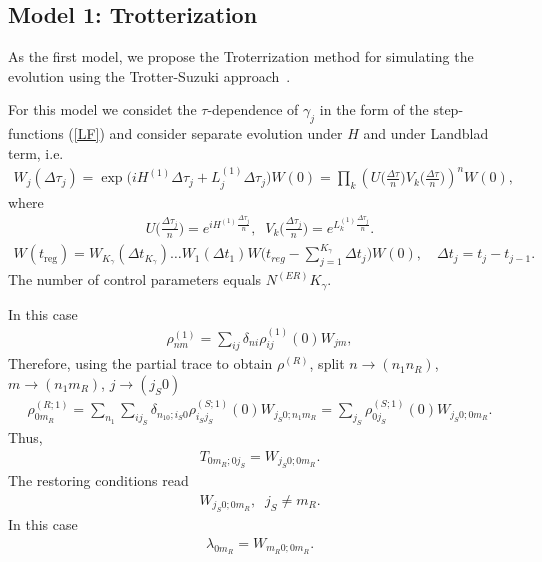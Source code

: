 \documentclass[pra,preprint,showpacs]{revtex4-1}
\begin{document}
\subsection{Model 1: Trotterization}
\label{Section:Trot}
As the first model, we propose the Troterrization method for simulating the evolution using the Trotter-Suzuki approach~\cite{Trotter,Suzuki}.
{For this model we considet the $\tau$-dependence of  $\gamma_j$ in the form of the  step-functions (\ref{LF})
and consider separate evolution under $H$ and under Landblad term, i.e.
\begin{eqnarray}
W_j(\Delta\tau_j) = \exp\Big( i H^{(1)}\Delta \tau_j + L^{(1)}_j \Delta \tau_j  \Big)W(0) = \prod_k
\left(U\Big(\frac{\Delta \tau}{n}\Big) V_k\Big(\frac{\Delta \tau}{n}\Big)\right)^n W(0),
\end{eqnarray}
where
\begin{eqnarray}
U\Big(\frac{\Delta \tau_j}{n}\Big) = e^{ i H^{(1)}\frac{\Delta \tau_j}{n}},\;\;
V_k\Big(\frac{\Delta \tau_j}{n}\Big) = e^{  L^{(1)}_k \frac{\Delta \tau_j}{n}} .
\end{eqnarray}
\begin{eqnarray}\label{UtK}
W(t_{\mathrm{reg}})=  W_{K_\gamma}(\Delta t_{K_\gamma})\dots W_1(\Delta t_1) W\Big(t_{reg} - \sum_{j=1}^{K_\gamma} \Delta t_j\Big) W(0),\quad  \Delta t_j = t_j -t_{j-1}.
\end{eqnarray}
The number of control parameters equals $N^{(ER)} K_\gamma$.

In this case
\begin{eqnarray}
\rho^{(1)}_{nm} = \sum_{ij} \delta_{ni}\rho^{(1)}_{ij}(0) W_{jm},
\end{eqnarray}
Therefore, using the partial trace to obtain $\rho^{(R)}$, split $n\to (n_1 n_R)$, $m\to (n_1 m_R)$, $j\to (j_S 0)$
\begin{eqnarray}
\rho^{(R;1)}_{0m_R} =\sum_{n_1} \sum_{ij_S} \delta_{n_10;i_S0}\rho^{(S;1)}_{i_Sj_S}(0) W_{j_S0;n_1m_R} =\sum_{j_S}\rho^{(S;1)}_{0j_S}(0) W_{j_S0;0m_R} .
\end{eqnarray}
Thus,
\begin{eqnarray}
T_{0m_R;0j_S} = W_{j_S0;0m_R}.
\end{eqnarray}
The restoring conditions read
\begin{eqnarray}
W_{j_S0;0m_R}, \;\;j_S\neq m_R .
\end{eqnarray}
In this case
\begin{eqnarray}
\lambda_{0m_R} =W_{m_R0;0m_R}.
\end{eqnarray}


}
\end{document}
